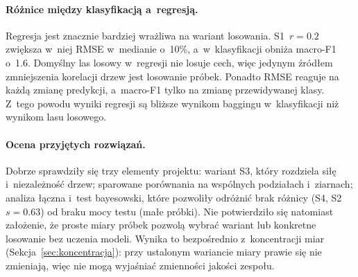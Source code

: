 \paragraph{Różnice między klasyfikacją a~regresją.} Regresja jest znacznie bardziej wrażliwa na wariant losowania. S1~$r=0.2$ zwiększa w~niej RMSE w~medianie o~10\%, a~w~klasyfikacji obniża macro-F1 o~1.6\pp{}. Domyślny las losowy w~regresji nie losuje cech, więc jedynym źródłem zmniejszenia korelacji drzew jest losowanie próbek. Ponadto RMSE reaguje na każdą zmianę predykcji, a~macro-F1 tylko na zmianę przewidywanej klasy. Z~tego powodu wyniki regresji są bliższe wynikom baggingu w~klasyfikacji niż wynikom lasu losowego.

\paragraph{Ocena przyjętych rozwiązań.} Dobrze sprawdziły się trzy elementy projektu: wariant S3, który rozdziela siłę i~niezależność drzew; sparowane porównania na wspólnych podziałach i~ziarnach; analiza łączna i~test bayesowski, które pozwoliły odróżnić brak różnicy (S4, S2~$s=0.63$) od braku mocy testu (małe próbki). Nie potwierdziło się natomiast założenie, że proste miary próbek pozwolą wybrać wariant lub konkretne losowanie bez uczenia modeli. Wynika to bezpośrednio z~koncentracji miar (Sekcja~\ref{sec:koncentracja}): przy ustalonym wariancie miary prawie się nie zmieniają, więc nie mogą wyjaśniać zmienności jakości zespołu.
